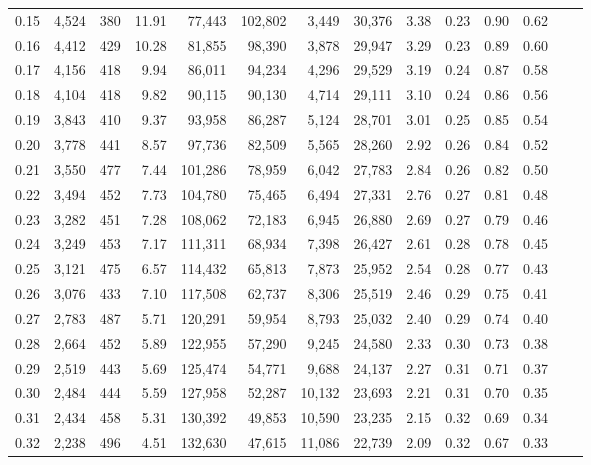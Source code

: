 \begin{tabular}{rrrrrrrrrrrrrr}
0.15 &  4,524 &  380 &   11.91 &   77,443 &  102,802 &   3,449 &  30,376 &  3.38 &  0.23 &  0.90 &      0.62 \\
0.16 &  4,412 &  429 &   10.28 &   81,855 &   98,390 &   3,878 &  29,947 &  3.29 &  0.23 &  0.89 &      0.60 \\
0.17 &  4,156 &  418 &    9.94 &   86,011 &   94,234 &   4,296 &  29,529 &  3.19 &  0.24 &  0.87 &      0.58 \\
0.18 &  4,104 &  418 &    9.82 &   90,115 &   90,130 &   4,714 &  29,111 &  3.10 &  0.24 &  0.86 &      0.56 \\
0.19 &  3,843 &  410 &    9.37 &   93,958 &   86,287 &   5,124 &  28,701 &  3.01 &  0.25 &  0.85 &      0.54 \\
0.20 &  3,778 &  441 &    8.57 &   97,736 &   82,509 &   5,565 &  28,260 &  2.92 &  0.26 &  0.84 &      0.52 \\
0.21 &  3,550 &  477 &    7.44 &  101,286 &   78,959 &   6,042 &  27,783 &  2.84 &  0.26 &  0.82 &      0.50 \\
0.22 &  3,494 &  452 &    7.73 &  104,780 &   75,465 &   6,494 &  27,331 &  2.76 &  0.27 &  0.81 &      0.48 \\
0.23 &  3,282 &  451 &    7.28 &  108,062 &   72,183 &   6,945 &  26,880 &  2.69 &  0.27 &  0.79 &      0.46 \\
0.24 &  3,249 &  453 &    7.17 &  111,311 &   68,934 &   7,398 &  26,427 &  2.61 &  0.28 &  0.78 &      0.45 \\
0.25 &  3,121 &  475 &    6.57 &  114,432 &   65,813 &   7,873 &  25,952 &  2.54 &  0.28 &  0.77 &      0.43 \\
0.26 &  3,076 &  433 &    7.10 &  117,508 &   62,737 &   8,306 &  25,519 &  2.46 &  0.29 &  0.75 &      0.41 \\
0.27 &  2,783 &  487 &    5.71 &  120,291 &   59,954 &   8,793 &  25,032 &  2.40 &  0.29 &  0.74 &      0.40 \\
0.28 &  2,664 &  452 &    5.89 &  122,955 &   57,290 &   9,245 &  24,580 &  2.33 &  0.30 &  0.73 &      0.38 \\
0.29 &  2,519 &  443 &    5.69 &  125,474 &   54,771 &   9,688 &  24,137 &  2.27 &  0.31 &  0.71 &      0.37 \\
0.30 &  2,484 &  444 &    5.59 &  127,958 &   52,287 &  10,132 &  23,693 &  2.21 &  0.31 &  0.70 &      0.35 \\
0.31 &  2,434 &  458 &    5.31 &  130,392 &   49,853 &  10,590 &  23,235 &  2.15 &  0.32 &  0.69 &      0.34 \\
0.32 &  2,238 &  496 &    4.51 &  132,630 &   47,615 &  11,086 &  22,739 &  2.09 &  0.32 &  0.67 &      0.33 \\

\end{tabular}
